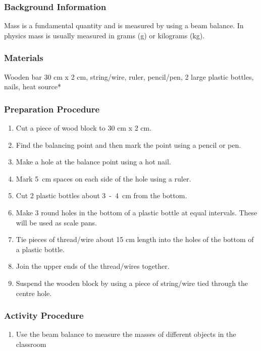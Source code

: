 \subsubsection*{Background Information}
Mass is a fundamental quantity and is measured by using a beam balance. In physics mass is usually measured in grams (g) or kilograms (kg).

\subsubsection*{Materials}
Wooden bar 30 cm x 2 cm, string/wire, ruler, pencil/pen, 2 large plastic bottles, nails, heat source*

\subsubsection*{Preparation Procedure}
\begin{enumerate}
\item{Cut a piece of wood block to 30 cm x 2 cm.} 
\item{Find the balancing point and then mark the point using a pencil or pen.} 
\item{Make a hole at the balance point using a hot nail.} 
\item{Mark 5~cm spaces on each side of the hole using a ruler.} 
\item{Cut 2 plastic bottles about 3~-~4~cm from the bottom.} 
\item{Make 3 round holes in the bottom of a plastic bottle at equal intervals. These will be used as scale pans.} 
\item{Tie pieces of thread/wire about 15 cm length into the holes of the bottom of a plastic bottle.} 
\item{Join the upper ends of the thread/wires together.} 
\item{Suspend the wooden block by using a piece of string/wire tied through the centre hole.} 
\end{enumerate}



\subsubsection*{Activity Procedure}
\begin{enumerate}
\item{Use the beam balance to measure the masses of different objects in the classroom}
\end{enumerate}

